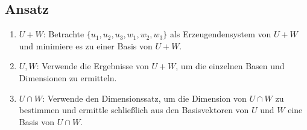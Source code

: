 \subsection{Ansatz}
\begin{enumerate}
	\item \( U + W \): Betrachte \( \{ u_1, u_2, u_3, w_1, w_2, w_3 \} \) als Erzeugendensystem von \( U + W \) und minimiere es zu einer Basis von \( U + W \).
	\item \( U, W \): Verwende die Ergebnisse von \( U+W \), um die einzelnen Basen und Dimensionen zu ermitteln.
	\item \( U \cap W \): Verwende den Dimensionssatz, um die Dimension von \( U \cap W \) zu bestimmen und ermittle schließlich aus den Basisvektoren von \( U \) und \( W \) eine Basis von \( U \cap W \). 
\end{enumerate}

